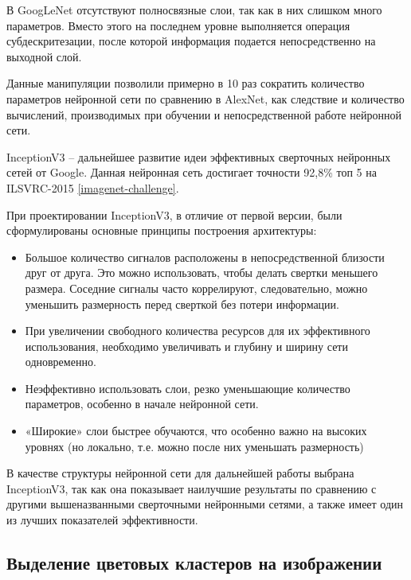 В GoogLeNet отсутствуют полносвязные слои, так как в них слишком много параметров. 
Вместо этого на последнем уровне выполняется операция субдескритезации, после которой информация подается непосредственно на выходной слой.

Данные манипуляции позволили примерно в 10 раз сократить количество параметров нейронной сети по сравнению в AlexNet, как следствие и количество вычислений, производимых при обучении и непосредственной работе нейронной сети.

InceptionV3 – дальнейшее развитие идеи эффективных сверточных нейронных сетей от Google. Данная нейронная сеть достигает точности 92,8\% топ 5 на ILSVRC-2015 \ref{imagenet-challenge}.
 

При проектировании InceptionV3, в отличие от первой версии, были сформулированы основные принципы построения архитектуры:
\begin{itemize}
    \item Большое количество сигналов расположены в непосредственной близости друг от друга. Это можно использовать, чтобы делать свертки меньшего размера. Соседние сигналы часто коррелируют, следовательно, можно уменьшить размерность перед сверткой без потери информации.
    \item При увеличении свободного количества ресурсов для их эффективного использования, необходимо увеличивать и глубину и ширину сети одновременно. 
    \item Неэффективно использовать слои, резко уменьшающие количество параметров, особенно в начале нейронной сети.
    \item «Широкие» слои быстрее обучаются, что особенно важно на высоких уровнях (но локально, т.е. можно после них уменьшать размерность)
\end{itemize}


В качестве структуры нейронной сети для дальнейшей работы выбрана InceptionV3, так как она показывает наилучшие результаты по сравнению с другими вышеназванными сверточными нейронными сетями, а также имеет один из лучших показателей эффективности.

\subsection{Выделение цветовых кластеров на изображении}


